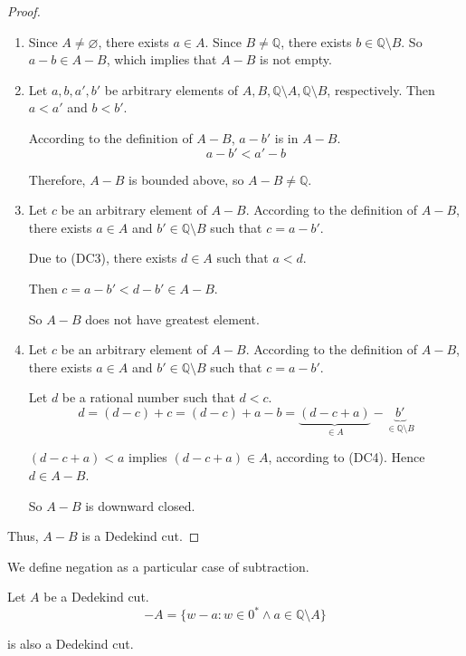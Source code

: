 \begin{proof}
    \begin{enumerate}[label={(\roman*)}]
        \item Since $A\ne\varnothing$, there exists $a\in A$. Since $B\ne\mathbb{Q}$, there exists $b\in\mathbb{Q}\setminus B$. So $a - b\in A - B$, which implies that $A - B$ is not empty.
        \item Let $a, b, a', b'$ be arbitrary elements of $A, B, \mathbb{Q}\setminus A, \mathbb{Q}\setminus B$, respectively. Then $a < a'$ and $b < b'$.

              According to the definition of $A - B$, $a - b'$ is in $A - B$.
              \[
                  a - b' < a' - b
              \]

              Therefore, $A - B$ is bounded above, so $A - B\ne\mathbb{Q}$.
        \item Let $c$ be an arbitrary element of $A - B$. According to the definition of $A - B$, there exists $a\in A$ and $b'\in\mathbb{Q}\setminus B$ such that $c = a - b'$.

              Due to (DC3), there exists $d\in A$ such that $a < d$.

              Then $c = a - b' < d - b' \in A - B$.

              So $A - B$ does not have greatest element.
        \item Let $c$ be an arbitrary element of $A - B$. According to the definition of $A - B$, there exists $a\in A$ and $b'\in\mathbb{Q}\setminus B$ such that $c = a - b'$.

              Let $d$ be a rational number such that $d < c$.
              \[
                  d = (d - c) + c = (d - c) + a - b = \underbrace{(d - c + a)}_{\in A} - \underbrace{b'}_{\in\mathbb{Q}\setminus B}
              \]

              $(d - c + a) < a$ implies $(d - c + a)\in A$, according to (DC4). Hence $d\in A - B$.

              So $A - B$ is downward closed.
    \end{enumerate}

    Thus, $A - B$ is a Dedekind cut.
\end{proof}

We define negation as a particular case of subtraction.

\begin{theorem}
    Let $A$ be a Dedekind cut.
    \[
        -A = \{ w - a : w\in{0}^{*} \wedge a\in\mathbb{Q}\setminus A \}
    \]

    is also a Dedekind cut.
\end{theorem}

